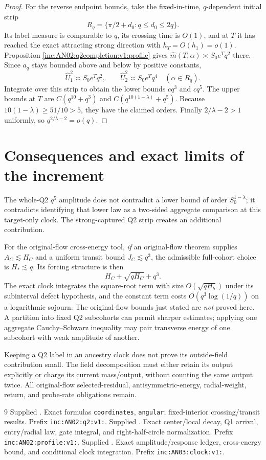 \documentclass[11pt]{article}
\theoremstyle{remark}\newtheorem{remark}[theorem]{Remark}
\begin{document}
\begin{proof}
For the reverse endpoint bounds, take the fixed-in-time, $q$-dependent initial strip
\[
 R_q=\{\pi/2+d_0:q\le d_0\le2q\}.
\]
Its label measure is comparable to $q$, its crossing time is $O(1)$, and at $T$ it has reached the exact attracting strong direction with $h_T=O(h_1)=o(1)$. Proposition \ref{inc:AN02:q2completion:v1:profile} gives $\widehat m(T,\alpha)\asymp S_0e^Tq^2$ there. Since $a_q$ stays bounded above and below by positive constants,
\[
 \widehat U_1^2\asymp S_0e^Tq^2,\qquad
 \widehat U_2^2\asymp S_0e^Tq^4
 \quad(\alpha\in R_q).
\]
Integrate over this strip to obtain the lower bounds $cq^3$ and $cq^5$. The upper bounds at $T$ are $C(q^{10}+q^3)$ and $C(q^{10(1-\lambda)}+q^5)$. Because $10(1-\lambda)\ge51/10>5$, they have the claimed orders. Finally $2/\lambda-2>1$ uniformly, so $q^{2/\lambda-2}=o(q)$.
\end{proof}

\section{Consequences and exact limits of the increment}
The whole-Q2 $q^5$ amplitude does not contradict a lower bound of order $S_0^{1-\lambda}$; it contradicts identifying that lower law as a two-sided aggregate comparison at this target-only clock. The strong-captured Q2 strip creates an additional contribution.

For the original-flow cross-energy tool, \emph{if} an original-flow theorem supplies $A_C\lesssim H_C$ and a uniform transit bound $J_C\lesssim q^3$, the admissible full-cohort choice is $H_*\lesssim q$. Its forcing structure is then
\[
 H_C+\sqrt{qH_C}+q^3.
\]
The exact clock integrates the square-root term with size $O(\sqrt{qH_b})$ under its subinterval defect hypothesis, and the constant term costs $O(q^3\log(1/q))$ on a logarithmic sojourn. The original-flow bounds just stated are \emph{not} proved here. A partition into fixed Q2 subcohorts can permit sharper estimates; applying one aggregate Cauchy--Schwarz inequality may pair transverse energy of one subcohort with weak amplitude of another.

Keeping a Q2 label in an ancestry clock does not prove its outside-field contribution small. The field decomposition must either retain its output explicitly or charge its current mass/output, without counting the same output twice. All original-flow selected-residual, antisymmetric-energy, radial-weight, return, and probe-rate obligations remain.

\begin{thebibliography}{9}\small
{} Supplied . Exact formulas \texttt{coordinates}, \texttt{angular}; fixed-interior crossing/transit results. Prefix \texttt{inc:AN02:q2:v1:}.
 Supplied . Exact center/local decay, Q1 arrival, entry/radial law, gate integral, and right-half-circle normalization. Prefix \texttt{inc:AN02:profile:v1:}.
 Supplied . Exact amplitude/response ledger, cross-energy bound, and conditional clock integration. Prefix \texttt{inc:AN03:clock:v1:}.
\end{thebibliography}
\end{document}
